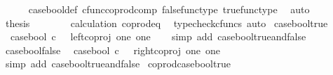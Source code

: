 \begin{isabellebody}
\ \ \ \ \isamarkupfalse%
\ case{\isacharunderscore}{\kern0pt}bool{\isacharunderscore}{\kern0pt}def{}\ cfunc{\isacharunderscore}{\kern0pt}coprod{\isacharunderscore}{\kern0pt}comp\ false{\isacharunderscore}{\kern0pt}func{\isacharunderscore}{\kern0pt}type\ true{\isacharunderscore}{\kern0pt}func{\isacharunderscore}{\kern0pt}type\ \isamarkupfalse%
\ auto\isanewline
\ \ \isamarkupfalse%
\ \isamarkupfalse%
\ {\isacharquery}{\kern0pt}thesis\ \isanewline
\ \ \ \ \isamarkupfalse%
\ \ calculation\ coprod{\isacharunderscore}{\kern0pt}eq{}\ \isamarkupfalse%
\ {\isacharparenleft}{\kern0pt}typecheck{\isacharunderscore}{\kern0pt}cfuncs{\isacharcomma}{\kern0pt}\ auto{\isacharparenright}{\kern0pt}\isanewline
{}\isamarkupfalse%
%
\endisatagproof
{\isafoldproof}%
%
\isadelimproof
\isanewline
%
\endisadelimproof
\isanewline
{}\isamarkupfalse%
\ case{\isacharunderscore}{\kern0pt}bool{\isacharunderscore}{\kern0pt}true{\isacharcolon}{\kern0pt}\isanewline
\ \ {\isachardoublequoteopen}case{\isacharunderscore}{\kern0pt}bool\ {\isasymcirc}\isactrlsub c\ {\isasymt}\ {\isacharequal}{\kern0pt}\ left{\isacharunderscore}{\kern0pt}coproj\ one\ one{\isachardoublequoteclose}\isanewline
%
\isadelimproof
\ \ %
\endisadelimproof
%
\isatagproof
{}\isamarkupfalse%
\ {\isacharparenleft}{\kern0pt}simp\ add{\isacharcolon}{\kern0pt}\ case{\isacharunderscore}{\kern0pt}bool{\isacharunderscore}{\kern0pt}true{\isacharunderscore}{\kern0pt}and{\isacharunderscore}{\kern0pt}false{\isacharparenright}{\kern0pt}%
\endisatagproof
{\isafoldproof}%
%
\isadelimproof
\isanewline
%
\endisadelimproof
\isanewline
{}\isamarkupfalse%
\ case{\isacharunderscore}{\kern0pt}bool{\isacharunderscore}{\kern0pt}false{\isacharcolon}{\kern0pt}\isanewline
\ \ {\isachardoublequoteopen}case{\isacharunderscore}{\kern0pt}bool\ {\isasymcirc}\isactrlsub c\ {\isasymf}\ {\isacharequal}{\kern0pt}\ right{\isacharunderscore}{\kern0pt}coproj\ one\ one{\isachardoublequoteclose}\isanewline
%
\isadelimproof
\ \ %
\endisadelimproof
%
\isatagproof
{}\isamarkupfalse%
\ {\isacharparenleft}{\kern0pt}simp\ add{\isacharcolon}{\kern0pt}\ case{\isacharunderscore}{\kern0pt}bool{\isacharunderscore}{\kern0pt}true{\isacharunderscore}{\kern0pt}and{\isacharunderscore}{\kern0pt}false{\isacharparenright}{\kern0pt}%
\endisatagproof
{\isafoldproof}%
%
\isadelimproof
\isanewline
%
\endisadelimproof
\isanewline
{}\isamarkupfalse%
\ coprod{\isacharunderscore}{\kern0pt}case{\isacharunderscore}{\kern0pt}bool{\isacharunderscore}{\kern0pt}true{\isacharcolon}{\kern0pt}\isanewline

\end{isabellebody}
